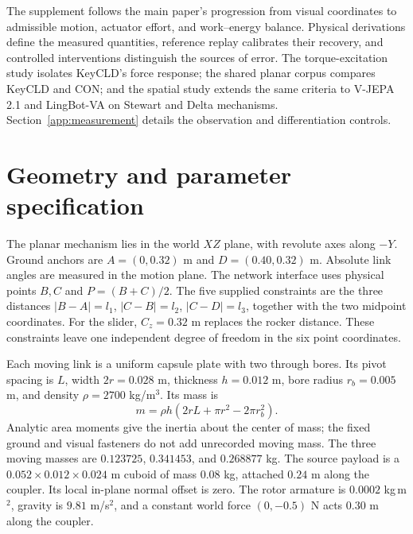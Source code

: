 \appendix
\setcounter{figure}{0}
\setcounter{table}{0}
\setcounter{equation}{0}
\renewcommand{\thefigure}{S\arabic{figure}}
\renewcommand{\thetable}{S\arabic{table}}
\renewcommand{\theequation}{S\arabic{equation}}
\renewcommand{\theHfigure}{supp.\arabic{figure}}
\renewcommand{\theHtable}{supp.\arabic{table}}
\renewcommand{\theHequation}{supp.\arabic{equation}}
\maketitlesupplementary
{}
\label{supplementstart}

The supplement follows the main paper's progression from visual coordinates to admissible motion, actuator effort, and work--energy balance. Physical derivations define the measured quantities, reference replay calibrates their recovery, and controlled interventions distinguish the sources of error. The torque-excitation study isolates KeyCLD's force response; the shared planar corpus compares KeyCLD and CON; and the spatial study extends the same criteria to V-JEPA 2.1 and LingBot-VA on Stewart and Delta mechanisms. Section~\ref{app:measurement} details the observation and differentiation controls.

\section{Geometry and parameter specification}
\label{app:mechanism}
The planar mechanism lies in the world $XZ$ plane, with revolute axes along $-Y$. Ground anchors are $A=(0,0.32)$ m and $D=(0.40,0.32)$ m. Absolute link angles are measured in the motion plane. The network interface uses physical points $B,C$ and $P=(B+C)/2$. The five supplied constraints are the three distances $|B-A|=l_1$, $|C-B|=l_2$, $|C-D|=l_3$, together with the two midpoint coordinates. For the slider, $C_z=0.32$ m replaces the rocker distance. These constraints leave one independent degree of freedom in the six point coordinates.

Each moving link is a uniform capsule plate with two through bores. Its pivot spacing is $L$, width $2r=0.028$ m, thickness $h=0.012$ m, bore radius $r_b=0.005$ m, and density $\rho=2700$ kg/m$^3$. Its mass is
\begin{equation}
m=\rho h\left(2rL+\pi r^2-2\pi r_b^2\right).
\end{equation}
Analytic area moments give the inertia about the center of mass; the fixed ground and visual fasteners do not add unrecorded moving mass. The three moving masses are $0.123725$, $0.341453$, and $0.268877$ kg. The source payload is a $0.052\times0.012\times0.024$ m cuboid of mass $0.08$ kg, attached $0.24$ m along the coupler. Its local in-plane normal offset is zero. The rotor armature is $0.0002$ kg\,m$^2$, gravity is $9.81$ m/s$^2$, and a constant world force $(0,-0.5)$ N acts $0.30$ m along the coupler.

